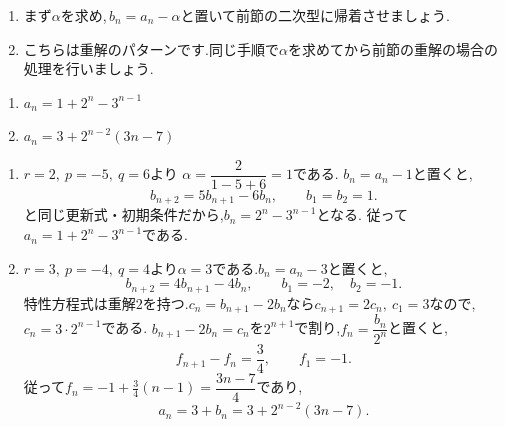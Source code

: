     \noindent{}\par\nobreak
    \begin{enumerate}[label=(\arabic*),parsep=3pt,format=\bookitemlink{example-three-term-2}{hint}{problem}]
      \item まず$\alpha$を求め,\,$b_n=a_n-\alpha$と置いて前節の二次型に帰着させましょう.
      \item こちらは重解のパターンです.同じ手順で$\alpha$を求めてから前節の重解の場合の処理を行いましょう.
    \end{enumerate}

    \noindent{}\par\nobreak
    \begin{enumerate}[label=(\arabic*),parsep=3pt,format=\bookitemlink{example-three-term-2}{answer}{problem}]
      \item $\displaystyle a_n=1+2^n-3^{n-1}$
      \item $\displaystyle a_n=3+2^{n-2}(3n-7)$
    \end{enumerate}

    \noindent{}\par\nobreak
    \begin{enumerate}[label=(\arabic*),parsep=3pt,format=\bookitemlink{example-three-term-2}{solution}{problem}]
      \item $r=2,\ p=-5,\ q=6$より\BookMathLayout{}{\\}%
            $\alpha=\dfrac{2}{1-5+6}=1$である.
            $b_n=a_n-1$と置くと,
            \[
              b_{n+2}=5b_{n+1}-6b_n,\qquad b_1=b_2=1.
            \]
            と同じ更新式・初期条件だから,$b_n=2^n-3^{n-1}$となる.
            従って$a_n=1+2^n-3^{n-1}$である.
      \item $r=3,\ p=-4,\ q=4$より$\alpha=3$である.$b_n=a_n-3$と置くと,
            \[
              b_{n+2}=4b_{n+1}-4b_n,\qquad b_1=-2,\quad b_2=-1.
            \]
            特性方程式は重解$2$を持つ.$c_n=b_{n+1}-2b_n$なら$c_{n+1}=2c_n,\ c_1=3$なので,$c_n=3\cdot2^{n-1}$である.
            $b_{n+1}-2b_n=c_n$を$2^{n+1}$で割り,$f_n=\dfrac{b_n}{2^n}$と置くと,
            \[
              f_{n+1}-f_n=\frac34,\qquad f_1=-1.
            \]
            従って$f_n=-1+\frac34(n-1)=\dfrac{3n-7}{4}$であり,
            \[
              a_n=3+b_n=3+2^{n-2}(3n-7).
            \]
    \end{enumerate}


